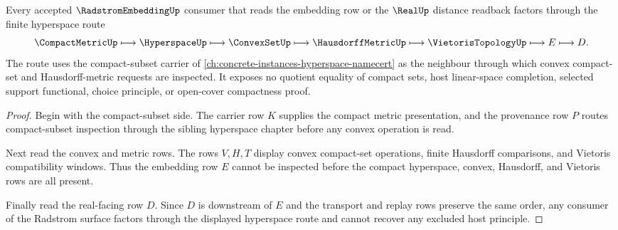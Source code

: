 \begin{theorem}\label{thm:radstrom-embedding-hyperspace-route}
Every accepted $\RadstromEmbeddingUp$ consumer that reads the embedding row or the $\RealUp$ distance readback factors through the finite hyperspace route
$$
\CompactMetricUp \longmapsto \HyperspaceUp \longmapsto \ConvexSetUp \longmapsto \HausdorffMetricUp \longmapsto \VietorisTopologyUp \longmapsto E \longmapsto D.
$$
The route uses the compact-subset carrier of \autoref{ch:concrete-instances-hyperspace-namecert} as the neighbour through which convex compact-set and Hausdorff-metric requests are inspected. It exposes no quotient equality of compact sets, host linear-space completion, selected support functional, choice principle, or open-cover compactness proof.
\end{theorem}
\begin{proof}
Begin with the compact-subset side. The carrier row $K$ supplies the compact metric presentation, and the provenance row $P$ routes compact-subset inspection through the sibling hyperspace chapter before any convex operation is read.

Next read the convex and metric rows. The rows $V,H,T$ display convex compact-set operations, finite Hausdorff comparisons, and Vietoris compatibility windows. Thus the embedding row $E$ cannot be inspected before the compact hyperspace, convex, Hausdorff, and Vietoris rows are all present.

Finally read the real-facing row $D$. Since $D$ is downstream of $E$ and the transport and replay rows preserve the same order, any consumer of the Radstrom surface factors through the displayed hyperspace route and cannot recover any excluded host principle.
\end{proof}



